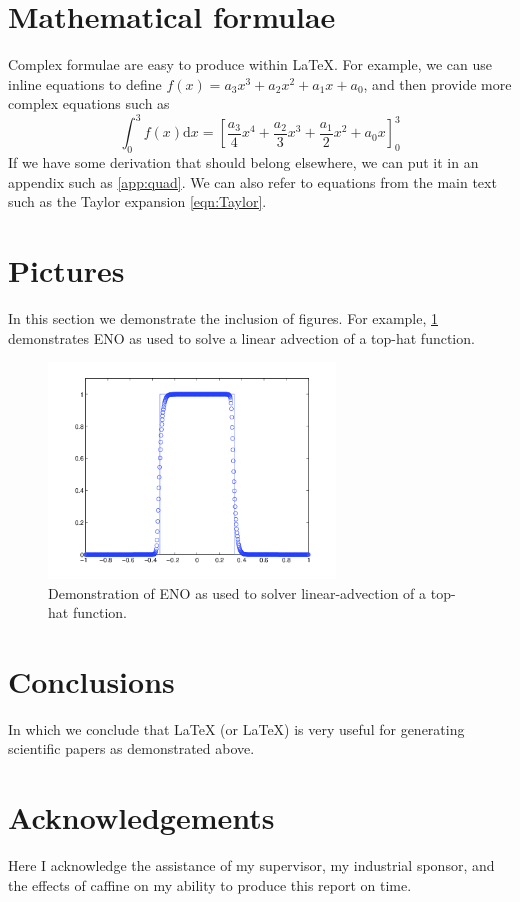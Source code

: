 \documentclass[final,3p,times,twocolumn]{elsarticle}
\begin{document}
\section{Mathematical formulae}
\label{sect:Formulae}
Complex formulae are easy to produce within \LaTeX{}. For example, we
can use inline equations to define $f(x) = a_3x^3 + a_2x^2 + a_1x +
a_0$, and then provide more complex equations such as
\begin{equation}
\int_0^3 f(x) \mathrm{d}x = \left[\frac{a_3}{4}x^4 + \frac{a_2}{3}x^3
  + \frac{a_1}{2}x^2 + a_0x\right]_0^3
\label{eqn:Taylor}
\end{equation}
If we have some derivation that should belong elsewhere, we can put it
in an appendix such as \ref{app:quad}. We can also refer to equations
from the main text such as the Taylor expansion \ref{eqn:Taylor}.
\section{Pictures}
\label{sect:Pictures}
In this section we demonstrate the inclusion of figures. For example,
\ref{fig:ENO1} demonstrates ENO as used to solve a linear advection
of a top-hat function.
\begin{figure}
\centering
\includegraphics[width=3in]{ENOTest3b.png}
\caption{Demonstration of ENO as used to solver linear-advection of a
  top-hat function.}
\label{fig:ENO1}
\end{figure}
\section{Conclusions}
\label{sect:Concl}
In which we conclude that LaTeX (or \LaTeX) is very useful for
generating scientific papers as demonstrated above.

\section*{Acknowledgements}
Here I acknowledge the assistance of my supervisor, my industrial sponsor,
and the effects of caffine on my ability to produce this report on time.
\end{document}

